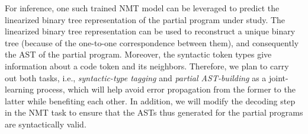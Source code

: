 For inference, one such trained NMT model can be leveraged to predict the linearized binary tree representation of the partial program under study.
The linearized binary tree representation can be used to reconstruct a unique binary tree (because of the one-to-one correspondence between them), and consequently the AST of the partial program. Moreover, the syntactic token types give information about a code token and its neighbors. Therefore, we plan to carry out both tasks, i.e., {\em syntactic-type tagging} and {\em partial AST-building} as a joint-learning process, which will help avoid error propagation from the former to the latter while benefiting each other. In addition, we will modify the decoding step in the NMT task to ensure that the ASTs thus generated for the partial programs are syntactically valid.
